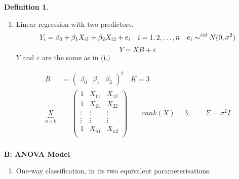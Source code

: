 \documentclass[11pt,a4paper]{article}
\theoremstyle{definition}
\newtheorem{defn}[thm]{Definition}
\newcommand{\subhead}[1]{%
  \par\medskip\noindent\textbf{#1}\par\nobreak\smallskip}
\begin{document}
\begin{defn}
\begin{enumerate}
\item[ii).] Linear regression with two predictors. $$Y_i=\beta_0 + \beta_1 X_{i1} + \beta_2 X_{i2} + e_i\quad  i=1,2,\ldots ,n\quad  e_i\thicksim ^{iid} N(0,\sigma^2)$$
$$Y=XB+\varepsilon$$
$Y$ and $\varepsilon$ are the same as in $($i.$)$

\begin{align*}
B & = 
\begin{pmatrix}
\beta_0 & \beta_1 & \beta_2
\end{pmatrix}^t\quad  K=3\\
\underbrace{X}_{n\times k} & = 
\begin{pmatrix}
1 & X_{11} & X_{12}\\
1 & X_{21} & X_{22}\\
\vdots & \vdots & \vdots\\
\vdots & \vdots & \vdots\\
1 & X_{n1} & X_{n2}\\
\end{pmatrix}
\qquad  rank(X)=3,\qquad  \Sigma = \sigma^2I\\
\end{align*}
\end{enumerate}


\subhead{B: ANOVA Model}
\begin{enumerate}
\item[i).] One-way classification, in its two equivalent parameterisations.


\end{enumerate}
\end{defn}
\end{document}
